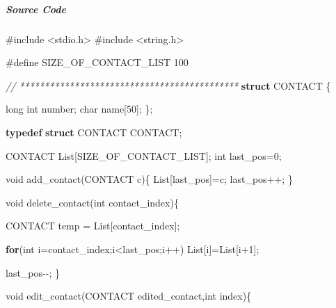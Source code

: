 \documentclass[
]{article}
\newenvironment{Shaded}{}{}
\newcommand{\CommentTok}[1]{\textcolor[rgb]{0.38,0.63,0.69}{\textit{#1}}}
\newcommand{\ControlFlowTok}[1]{\textcolor[rgb]{0.00,0.44,0.13}{\textbf{#1}}}
\newcommand{\DataTypeTok}[1]{\textcolor[rgb]{0.56,0.13,0.00}{#1}}
\newcommand{\DecValTok}[1]{\textcolor[rgb]{0.25,0.63,0.44}{#1}}
\newcommand{\ImportTok}[1]{#1}
\newcommand{\KeywordTok}[1]{\textcolor[rgb]{0.00,0.44,0.13}{\textbf{#1}}}
\newcommand{\NormalTok}[1]{#1}
\newcommand{\OperatorTok}[1]{\textcolor[rgb]{0.40,0.40,0.40}{#1}}
\newcommand{\PreprocessorTok}[1]{\textcolor[rgb]{0.74,0.48,0.00}{#1}}
\begin{document}
\hypertarget{source-code}{%
\subparagraph{Source Code}\label{source-code}}

\begin{Shaded}
\begin{Highlighting}[]

\PreprocessorTok{\#include }\ImportTok{\textless{}stdio.h\textgreater{}}
\PreprocessorTok{\#include }\ImportTok{\textless{}string.h\textgreater{}}

\PreprocessorTok{\#define SIZE\_OF\_CONTACT\_LIST 100}

\CommentTok{// ********************************************}
\KeywordTok{struct}\NormalTok{ CONTACT }\OperatorTok{\{}

    \DataTypeTok{long} \DataTypeTok{int}\NormalTok{ number}\OperatorTok{;}
    \DataTypeTok{char}\NormalTok{ name}\OperatorTok{[}\DecValTok{50}\OperatorTok{];}
\OperatorTok{\};}

\KeywordTok{typedef} \KeywordTok{struct}\NormalTok{ CONTACT CONTACT}\OperatorTok{;}

\NormalTok{CONTACT List}\OperatorTok{[}\NormalTok{SIZE\_OF\_CONTACT\_LIST}\OperatorTok{];}
\DataTypeTok{int}\NormalTok{ last\_pos}\OperatorTok{=}\DecValTok{0}\OperatorTok{;}

\DataTypeTok{void}\NormalTok{ add\_contact}\OperatorTok{(}\NormalTok{CONTACT c}\OperatorTok{)\{}
\NormalTok{    List}\OperatorTok{[}\NormalTok{last\_pos}\OperatorTok{]=}\NormalTok{c}\OperatorTok{;}
\NormalTok{    last\_pos}\OperatorTok{++;}
\OperatorTok{\}}

\DataTypeTok{void}\NormalTok{ delete\_contact}\OperatorTok{(}\DataTypeTok{int}\NormalTok{ contact\_index}\OperatorTok{)\{}

\NormalTok{    CONTACT temp }\OperatorTok{=}\NormalTok{ List}\OperatorTok{[}\NormalTok{contact\_index}\OperatorTok{];}

    \ControlFlowTok{for}\OperatorTok{(}\DataTypeTok{int}\NormalTok{ i}\OperatorTok{=}\NormalTok{contact\_index}\OperatorTok{;}\NormalTok{i}\OperatorTok{\textless{}}\NormalTok{last\_pos}\OperatorTok{;}\NormalTok{i}\OperatorTok{++)}
\NormalTok{        List}\OperatorTok{[}\NormalTok{i}\OperatorTok{]=}\NormalTok{List}\OperatorTok{[}\NormalTok{i}\OperatorTok{+}\DecValTok{1}\OperatorTok{];}

\NormalTok{    last\_pos}\OperatorTok{{-}{-};}
\OperatorTok{\}}

\DataTypeTok{void}\NormalTok{ edit\_contact}\OperatorTok{(}\NormalTok{CONTACT edited\_contact}\OperatorTok{,}\DataTypeTok{int}\NormalTok{ index}\OperatorTok{)\{}


\end{Highlighting}
\end{Shaded}
\end{document}
